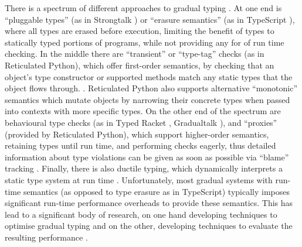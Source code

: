 \documentclass[sigplan,10pt,review,screen]{acmart}\settopmatter{printfolios=true}
\begin{document}
There is a spectrum of different approaches to gradual typing
\cite{kafka18,bensurvey18icfp}.
At one end is ``pluggable types'' (as in Strongtalk \cite{strongtalk}) or ``erasure
semantics'' (as in 
TypeScript
\citep{typeScriptECOOP}), where
%
all types are erased before execution, limiting the benefit of
types to statically typed portions of programs, while not providing 
any for of run time checking.  In the middle there are
``transient'' or ``type-tag'' checks (as in Reticulated Python),
which offer first-order semantics, by checking
that an object's type constructor or supported methods match
any static types
that the object flows through.
\cite{Siek2007,Bloom2009,concrete15,reticPython2014,Greenman2018}.
Reticulated Python also supports alternative ``monotonic'' semantics
which mutate objects by narrowing their concrete types when passed
into contexts with more specific types.
On the other end of the spectrum are behavioural
type checks (as in Typed Racket \cite{typedScheme08,takikawa2012},
Gradualtalk \cite{gradualtalk14}),
and ``proxies'' (provided by Reticulated Python), which
support higher-order semantics, retaining
types until run 
time, and performing checks eagerly, thus detailed information
about type violations can be given as soon as possible via ``blame''
tracking \cite{blame2009,blameForAll2011}.
Finally, there is also ductile typing,
which dynamically interprets a static type system at run time
\cite{Ductile2011}.
%
%
Unfortunately, most gradual systems with run-time semantics
(as opposed to type erasure as in TypeScript) typically
imposes significant run-time performance overheads to provide these
semantics.  This has lead to a significant body of research,
on one hand developing techniques to optimise gradual typing 
\citep{Vitousek2017,Muehlboeck2017,Bauman2017,Richards2017,Greenman2018}
and on the other, developing techniques to evaluate the
resulting performance  \cite{Takikawa2016,Greenman2019jfp}.
\end{document}
